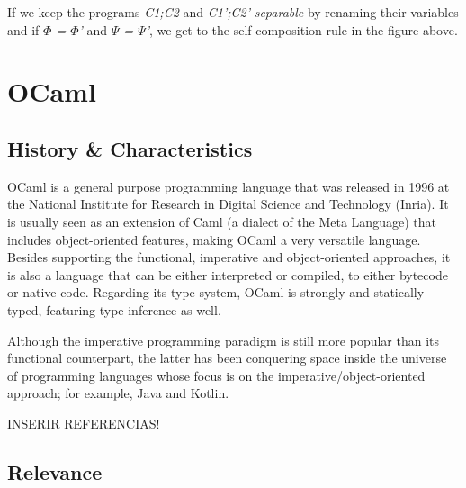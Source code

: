 If we keep the programs \emph{C1;C2} and \emph{C1';C2'} \emph{separable} by renaming their variables and if \emph{$\Phi$ = $\Phi$'} and \emph{$\Psi$ = $\Psi$'}, we get to the self-composition rule in the figure above.


\section{OCaml}
\label{sec:ocaml}

\subsection{History \& Characteristics} 
\label{sub:overview}

OCaml is a general purpose programming language that was released in 1996 at the National Institute for Research in Digital Science and Technology (Inria).
It is usually seen as an extension of Caml (a dialect of the Meta Language) that includes object-oriented features, making OCaml a very versatile language.
Besides supporting the functional, imperative and object-oriented approaches, it is also a language that can be either interpreted or compiled, to either bytecode or native code. 
Regarding its type system, OCaml is strongly and statically typed, featuring type inference as well.

Although the imperative programming paradigm is still more popular than its functional counterpart, the latter has been conquering space inside the universe of programming languages whose focus is on the imperative/object-oriented approach; for example, Java and Kotlin.

INSERIR REFERENCIAS!

\subsection{Relevance} 
\label{sub:relevance}

